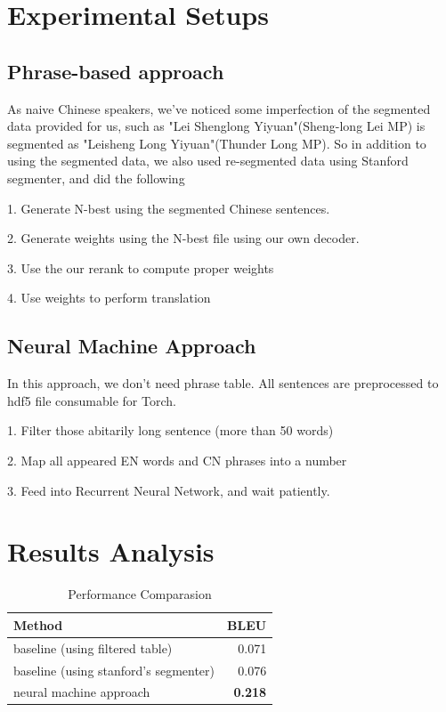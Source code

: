 \documentclass[11pt,letterpaper]{article}
\begin{document}
\section{Experimental Setups}
\subsection{Phrase-based approach}

As naive Chinese speakers, we've noticed some imperfection of the segmented data provided for us, such as "Lei Shenglong Yiyuan"(Sheng-long Lei MP) is segmented as "Leisheng Long Yiyuan"(Thunder Long MP). So in addition to using the segmented data, we also used re-segmented data using Stanford segmenter\cite{}, and did the following

1. Generate N-best using the segmented Chinese sentences.

2. Generate weights using the N-best file using our own decoder.

3. Use the our rerank to compute proper weights

4. Use weights to perform translation

\subsection{Neural Machine Approach}
In this approach, we don't need phrase table. All sentences are preprocessed to hdf5 file consumable for Torch.

1. Filter those abitarily long sentence (more than 50 words)

2. Map all appeared EN words and CN phrases into a number

3. Feed into Recurrent Neural Network, and wait patiently.

\section{Results Analysis}
\begin{table}[h]
\begin{center}
\begin{tabular}{|l|r|}
\hline
Method & \bf BLEU  \\ 
\hline
baseline (using filtered table)	&	0.071\\
baseline (using stanford's segmenter)		&	0.076 \\
neural machine approach		&	\textbf{0.218}  \\
\hline
\end{tabular}
\end{center}
\caption{\label{perfm} Performance Comparasion }
\end{table}
\end{document}
